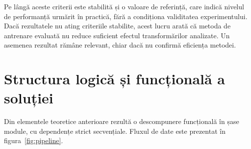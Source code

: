 Pe lângă aceste criterii este stabilită și o valoare de referință, care indică nivelul de performanță urmărit în practică, fără a condiționa validitatea experimentului. Dacă rezultatele nu ating criteriile stabilite, acest lucru arată că metoda de antrenare evaluată nu reduce suficient efectul transformărilor analizate. Un asemenea rezultat rămâne relevant, chiar dacă nu confirmă eficiența metodei.

\section{Structura logică și funcțională a soluției}\label{sec:structura}

Din elementele teoretice anterioare rezultă o descompunere funcțională în șase module, cu dependențe strict secvențiale. Fluxul de date este prezentat în figura~\ref{fig:pipeline}.

